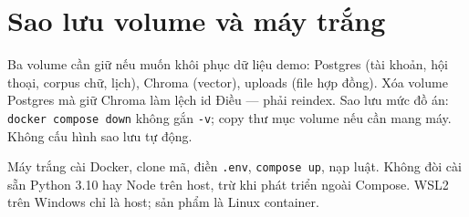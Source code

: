 \section{Sao lưu volume và máy trắng}

Ba volume cần giữ nếu muốn khôi phục dữ liệu demo: Postgres (tài khoản, hội
thoại, corpus chữ, lịch), Chroma (vector), uploads (file hợp đồng). Xóa volume
Postgres mà giữ Chroma làm lệch id Điều --- phải reindex. Sao lưu mức đồ án:
\texttt{docker compose down} không gắn \texttt{-v}; copy thư mục volume nếu cần
mang máy. Không cấu hình sao lưu tự động.

Máy trắng cài Docker, clone mã, điền \texttt{.env}, \texttt{compose up}, nạp
luật. Không đòi cài sẵn Python 3.10 hay Node trên host, trừ khi phát triển ngoài
Compose. WSL2 trên Windows chỉ là host; sản phẩm là Linux container.
